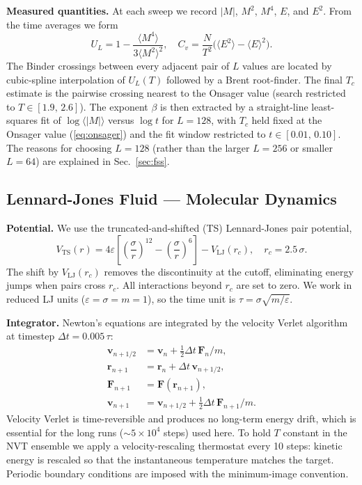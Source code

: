 \documentclass[12pt,a4paper]{article}
\begin{document}
\textbf{Measured quantities.} At each sweep we record $|M|$, $M^2$, $M^4$, $E$, and
$E^2$. From the time averages we form
\begin{equation}
  U_L = 1 - \frac{\langle M^4 \rangle}{3 \langle M^2 \rangle^2},
  \quad
  C_v = \frac{N}{T^2}\bigl(\langle E^2 \rangle - \langle E \rangle^2\bigr).
\end{equation}
The Binder crossings between every adjacent pair of $L$ values are located by cubic-spline
interpolation of $U_L(T)$ followed by a Brent root-finder. The final $T_c$ estimate is
the pairwise crossing nearest to the Onsager value (search restricted to $T \in
[1.9,\, 2.6]$). The exponent $\beta$ is then extracted by a straight-line least-squares
fit of $\log \langle |M| \rangle$ versus $\log t$ for $L = 128$, with $T_c$ held fixed
at the Onsager value (\ref{eq:onsager}) and the fit window restricted to $t \in
[0.01,\, 0.10]$. The reasons for choosing $L = 128$ (rather than the larger $L = 256$
or smaller $L = 64$) are explained in Sec.~\ref{sec:fss}.

\subsection{Lennard-Jones Fluid --- Molecular Dynamics}

\textbf{Potential.} We use the truncated-and-shifted (TS) Lennard-Jones pair potential,
\begin{equation}
  V_\mathrm{TS}(r) = 4\varepsilon\left[\!\left(\frac{\sigma}{r}\right)^{12}
         \!-\left(\frac{\sigma}{r}\right)^6\right] - V_\mathrm{LJ}(r_c),
  \quad r_c = 2.5\,\sigma.
\end{equation}
The shift by $V_\mathrm{LJ}(r_c)$ removes the discontinuity at the cutoff, eliminating
energy jumps when pairs cross $r_c$. All interactions beyond $r_c$ are set to zero. We
work in reduced LJ units ($\varepsilon = \sigma = m = 1$), so the time unit is $\tau =
\sigma \sqrt{m/\varepsilon}$.

\textbf{Integrator.} Newton's equations are integrated by the velocity Verlet algorithm
at timestep $\Delta t = 0.005\,\tau$:
\begin{align}
  \mathbf{v}_{n+1/2} &= \mathbf{v}_n + \tfrac{1}{2} \Delta t\, \mathbf{F}_n / m, \\
  \mathbf{r}_{n+1}   &= \mathbf{r}_n + \Delta t\, \mathbf{v}_{n+1/2}, \\
  \mathbf{F}_{n+1}   &= \mathbf{F}(\mathbf{r}_{n+1}), \\
  \mathbf{v}_{n+1}   &= \mathbf{v}_{n+1/2} + \tfrac{1}{2} \Delta t\, \mathbf{F}_{n+1}/m.
\end{align}
Velocity Verlet is time-reversible and produces no long-term energy drift, which is
essential for the long runs ($\sim 5 \times 10^4$ steps) used here. To hold $T$ constant
in the NVT ensemble we apply a velocity-rescaling thermostat every 10 steps: kinetic
energy is rescaled so that the instantaneous temperature matches the target. Periodic
boundary conditions are imposed with the minimum-image convention.
\end{document}
